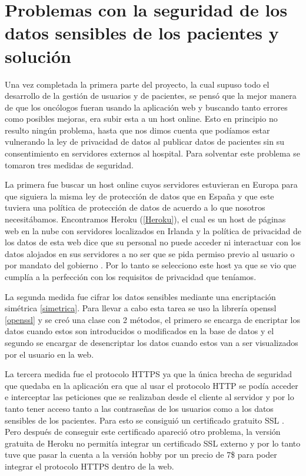 \section{Problemas con la seguridad de los datos sensibles de los pacientes y solución} \label{seguridad}

Una vez completada la primera parte del proyecto, la cual supuso todo el desarrollo de la gestión de usuarios y de pacientes, se pensó que la mejor manera de que los oncólogos fueran usando la aplicación web y buscando tanto errores como posibles mejoras, era subir esta a un host online. Esto en principio no resulto ningún problema, hasta que nos dimos cuenta que podíamos estar vulnerando la ley de privacidad de datos al publicar datos de pacientes sin su consentimiento en servidores externos al hospital. Para solventar este problema se tomaron tres medidas de seguridad.

La primera fue buscar un host online cuyos servidores estuvieran en Europa para que siguiera la misma ley de protección de datos que en España y que este tuviera una política de protección de datos de acuerdo a lo que nosotros necesitábamos. Encontramos Heroku (\ref{Heroku}), el cual es un host de páginas web en la nube con servidores localizados en Irlanda \cite{herokulocalizacion} y la política de privacidad de los datos de esta web dice que su personal no puede acceder ni interactuar con los datos alojados en sus servidores a no ser que se pida permiso previo al usuario o por mandato del gobierno \cite{herokuprivacidad}. Por lo tanto se selecciono este host ya que se vio que cumplía a la perfección con los requisitos de privacidad que teníamos. 

La segunda medida fue cifrar los datos sensibles mediante una encriptación simétrica \ref{simetrica}. Para llevar a cabo esta tarea se uso la librería openssl \ref{openssl} y se creó una clase con 2 métodos, el primero se encarga de encriptar los datos cuando estos son introducidos o modificados en la base de datos y el segundo se encargar de desencriptar los datos cuando estos van a ser visualizados por el usuario en la web. 

La tercera medida fue el protocolo HTTPS ya que la única brecha de seguridad que quedaba en la aplicación era que al usar el protocolo HTTP se podía acceder e interceptar las peticiones que se realizaban desde el cliente al servidor y por lo tanto tener acceso tanto a las contraseñas de los usuarios como a los datos sensibles de los pacientes. Para esto se consiguió un certificado gratuito SSL \cite{ssl}. Pero después de conseguir este certificado apareció otro problema, la versión gratuita de Heroku no permitía integrar un certificado SSL externo y por lo tanto tuve que pasar la cuenta a la versión hobby por un precio de 7\$ para poder integrar el protocolo HTTPS dentro de la web.

